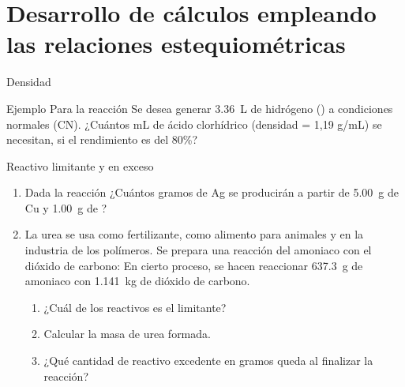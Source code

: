 \documentclass[11pt, aspectratio=169, xcolor=table]{beamer}
\begin{document}
\section{Desarrollo de cálculos empleando las relaciones estequiométricas}

\begin{frame}{Densidad}
  \begin{block}{Ejemplo}
	Para la reacción  Se desea generar \qty{3,36}{L} de hidrógeno () a condiciones normales (CN). ¿Cuántos mL de ácido clorhídrico (densidad = 1,19 g/mL) se necesitan, si el rendimiento es del 80\%?
  \end{block}
\end{frame}

\begin{frame}{Reactivo limitante y en exceso}
  \begin{enumerate}
    \item Dada la reacción  ¿Cuántos gramos de Ag se producirán a partir de \qty{5,00}{g} de Cu y \qty{1,00}{g} de ?
    \item La urea  se usa como fertilizante, como alimento para animales y en la industria de los polímeros. Se prepara una reacción del amoniaco con el dióxido de carbono:  En cierto proceso, se hacen reaccionar \qty{637,3}{g} de amoniaco con \qty{1,141}{kg} de dióxido de carbono.
          \begin{enumerate}
            \item ¿Cuál de los reactivos es el limitante?
            \item Calcular la masa de urea formada.
            \item ¿Qué cantidad de reactivo excedente en gramos queda al finalizar la reacción?
          \end{enumerate}
  \end{enumerate}
\end{frame}
\end{document}
